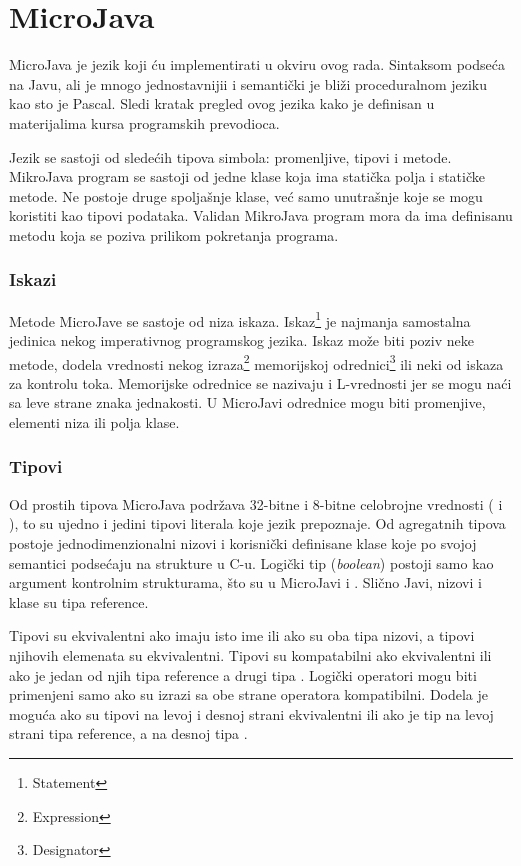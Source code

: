 
\chapter{MicroJava}

MicroJava je jezik koji ću implementirati u okviru ovog rada. Sintaksom podseća na Javu, ali je mnogo jednostavnijii i semantički je bliži proceduralnom jeziku kao sto je Pascal. Sledi kratak pregled ovog jezika kako je definisan u materijalima kursa programskih prevodioca.

Jezik se sastoji od sledećih tipova simbola: promenljive, tipovi i metode. MikroJava program se sastoji od jedne klase koja ima statička polja i statičke metode. Ne postoje druge spoljašnje klase, već samo unutrašnje koje se mogu koristiti kao tipovi podataka. Validan  MikroJava program mora da ima definisanu metodu  koja se poziva prilikom pokretanja programa.

\subsection*{Iskazi}

Metode MicroJave se sastoje od niza iskaza. Iskaz\footnote{\eng Statement} je najmanja samostalna jedinica nekog imperativnog programskog jezika. Iskaz može biti poziv neke metode, dodela vrednosti nekog izraza\footnote{\eng Expression} memorijskoj odrednici\footnote{\eng Designator} ili neki od iskaza za kontrolu toka. Memorijske odrednice se nazivaju i L-vrednosti jer se mogu naći sa leve strane znaka jednakosti. U MicroJavi odrednice mogu biti promenjive, elementi niza ili polja klase.

\subsection*{Tipovi}

Od prostih tipova MicroJava podržava 32-bitne i 8-bitne celobrojne vrednosti ( i ), to su ujedno i jedini tipovi literala koje jezik prepoznaje. Od agregatnih tipova postoje jednodimenzionalni nizovi i korisnički definisane  klase koje po svojoj semantici podsećaju na strukture u C-u. Logički tip (\textit{boolean}) postoji samo kao argument kontrolnim strukturama, što su u MicroJavi  i . Slično Javi, nizovi i klase su tipa reference.

Tipovi su ekvivalentni ako imaju isto ime ili ako su oba tipa nizovi, a tipovi njihovih elemenata su ekvivalentni. Tipovi su kompatabilni ako ekvivalentni ili ako je jedan od njih tipa reference a drugi tipa . Logički operatori mogu biti primenjeni samo ako su izrazi sa obe strane operatora kompatibilni. Dodela je moguća ako su tipovi na levoj i desnoj strani ekvivalentni ili ako je tip na levoj strani tipa reference, a na desnoj tipa .

